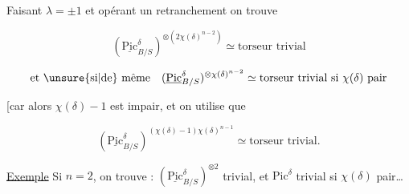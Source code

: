 Faisant $\lambda=\pm1$ et opérant un retranchement on trouve

\[
(\underline{\mathrm{Pic}}^\delta_{B/S})^{\otimes(2\chi(\delta)^{n-2})}\simeq\text{torseur trivial}
\]

\[
\text{et \unsure{si|de} même}\quad(\underline{\mathrm{Pic}}^\delta_{B/S})^{\otimes\chi(\delta)^{n-2}}\simeq\text{torseur trivial si }\chi(\delta)\text{ pair}
\]

[car alors $\chi(\delta)-1$ est impair, et on utilise que

\[
(\underline{\mathrm{Pic}}^\delta_{B/S})^{(\chi(\delta)-1)\chi(\delta)^{n-1}}\simeq\text{torseur trivial}.
\]

\uline{Exemple} Si $n=2$, on trouve : $(\underline{\mathrm{Pic}}^\delta_{B/S})^{\otimes2}$ trivial, et $\mathrm{Pic}^\delta$ trivial si $\chi(\delta)$ pair\ldots

